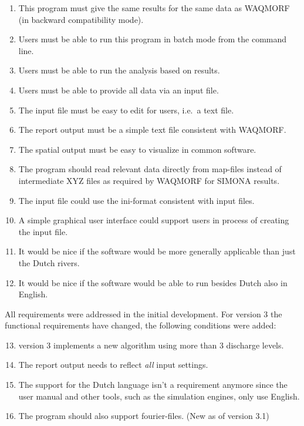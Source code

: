 \begin{enumerate}
\item This program must give the same results for the same data as WAQMORF (in backward compatibility mode).
\item Users must be able to run this program in batch mode from the command line.
\item Users must be able to run the analysis based on \dflowfm results.
\item Users must be able to provide all data via an input file.
\item The input file must be easy to edit for users, i.e.~a text file.
\item The report output must be a simple text file consistent with WAQMORF.
\item The spatial output must be easy to visualize in common software.

\item The program should read relevant data directly from \dflowfm map-files instead of intermediate XYZ files as required by WAQMORF for SIMONA results.

\item The input file could use the ini-format consistent with \dflowfm input files.
\item A simple graphical user interface could support users in process of creating the input file.

\item It would be nice if the software would be more generally applicable than just the Dutch rivers.
\item It would be nice if the software would be able to run besides Dutch also in English.
\end{enumerate}

All requirements were addressed in the initial development.
For \dfastmi version 3 the functional requirements have changed, the following conditions were added:

\begin{enumerate}
\setcounter{enumi}{12} %
\item \dfastmi version 3 implements a new algorithm using more than 3 discharge levels.
\item The report output needs to reflect \emph{all} input settings.
\item The support for the Dutch language isn't a requirement anymore since the user manual and other tools, such as the simulation engines, only use English.
\item The program should also support \dflowfm fourier-files. (New as of version 3.1)
\end{enumerate}


